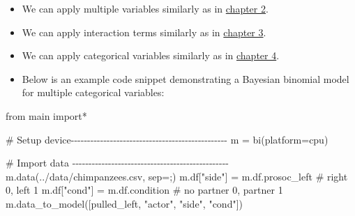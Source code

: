 \documentclass[
  letterpaper,
  DIV=11,
  numbers=noendperiod]{scrreprt}
\newenvironment{Shaded}{\begin{snugshade}}{\end{snugshade}}
\newcommand{\CommentTok}[1]{\textcolor[rgb]{0.37,0.37,0.37}{#1}}
\newcommand{\ImportTok}[1]{\textcolor[rgb]{0.00,0.46,0.62}{#1}}
\newcommand{\NormalTok}[1]{\textcolor[rgb]{0.00,0.23,0.31}{#1}}
\newcommand{\OperatorTok}[1]{\textcolor[rgb]{0.37,0.37,0.37}{#1}}
\newcommand{\StringTok}[1]{\textcolor[rgb]{0.13,0.47,0.30}{#1}}
\begin{document}
\begin{tcolorbox}[enhanced jigsaw, toptitle=1mm, opacityback=0, titlerule=0mm, breakable, bottomrule=.15mm, colframe=quarto-callout-note-color-frame, arc=.35mm, coltitle=black, left=2mm, opacitybacktitle=0.6, leftrule=.75mm, toprule=.15mm, rightrule=.15mm, bottomtitle=1mm, colbacktitle=quarto-callout-note-color!10!white, title=\textcolor{quarto-callout-note-color}{\faInfo}\hspace{0.5em}{Note}, colback=white]

\begin{itemize}
\item
  We can apply multiple variables similarly as in
  \href{./2.\%20Multiple\%20Regression\%20for\%20Continuous\%20Variables.qmd}{chapter
  2}.
\item
  We can apply interaction terms similarly as in
  \href{/3.\%20Interaction\%20between\%20continuous\%20variables.qmd}{chapter
  3}.
\item
  We can apply categorical variables similarly as in
  \href{4.\%20Categorical\%20variable.qmd}{chapter 4}.
\item
  Below is an example code snippet demonstrating a Bayesian binomial
  model for multiple categorical variables:
\end{itemize}

\begin{Shaded}
\begin{Highlighting}[]
\ImportTok{from}\NormalTok{ main }\ImportTok{import}\OperatorTok{*}

\CommentTok{\# Setup device{-}{-}{-}{-}{-}{-}{-}{-}{-}{-}{-}{-}{-}{-}{-}{-}{-}{-}{-}{-}{-}{-}{-}{-}{-}{-}{-}{-}{-}{-}{-}{-}{-}{-}{-}{-}{-}{-}{-}{-}{-}{-}{-}{-}{-}{-}{-}{-}}
\NormalTok{m }\OperatorTok{=}\NormalTok{ bi(platform}\OperatorTok{=}\StringTok{\textquotesingle{}cpu\textquotesingle{}}\NormalTok{)}

\CommentTok{\# Import data {-}{-}{-}{-}{-}{-}{-}{-}{-}{-}{-}{-}{-}{-}{-}{-}{-}{-}{-}{-}{-}{-}{-}{-}{-}{-}{-}{-}{-}{-}{-}{-}{-}{-}{-}{-}{-}{-}{-}{-}{-}{-}{-}{-}{-}{-}{-}{-}}
\NormalTok{m.data(}\StringTok{\textquotesingle{}../data/chimpanzees.csv\textquotesingle{}}\NormalTok{, sep}\OperatorTok{=}\StringTok{\textquotesingle{};\textquotesingle{}}\NormalTok{) }
\NormalTok{m.df[}\StringTok{"side"}\NormalTok{] }\OperatorTok{=}\NormalTok{ m.df.prosoc\_left  }\CommentTok{\# right 0, left 1}
\NormalTok{m.df[}\StringTok{"cond"}\NormalTok{] }\OperatorTok{=}\NormalTok{ m.df.condition  }\CommentTok{\# no partner 0, partner 1}
\NormalTok{m.data\_to\_model([}\StringTok{\textquotesingle{}pulled\_left\textquotesingle{}}\NormalTok{, }\StringTok{"actor"}\NormalTok{, }\StringTok{"side"}\NormalTok{, }\StringTok{"cond"}\NormalTok{])}


\end{Highlighting}
\end{Shaded}
\end{tcolorbox}
\end{document}
